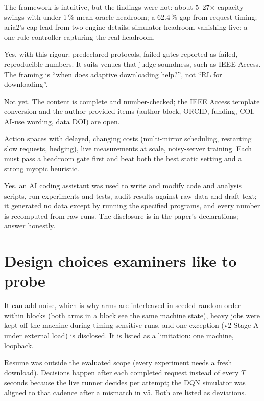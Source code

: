 \A The framework is intuitive, but the findings were not: about 5--27$\times$ capacity swings with under 1\,\% mean oracle headroom; a 62.4\,\% gap from request timing; aria2's cap lead from two engine details; simulator headroom vanishing live; a one-rule controller capturing the real headroom.

\A Yes, with this rigour: predeclared protocols, failed gates reported as failed, reproducible numbers. It suits venues that judge soundness, such as IEEE Access. The framing is ``when does adaptive downloading help?'', not ``RL for downloading''.

\A Not yet. The content is complete and number-checked; the IEEE Access template conversion and the author-provided items (author block, ORCID, funding, COI, AI-use wording, data DOI) are open.

\A Action spaces with delayed, changing costs (multi-mirror scheduling, restarting slow requests, hedging), live measurements at scale, noisy-server training. Each must pass a headroom gate first and beat both the best static setting and a strong myopic heuristic.

\A Yes, an AI coding assistant was used to write and modify code and analysis scripts, run experiments and tests, audit results against raw data and draft text; it generated no data except by running the specified programs, and every number is recomputed from raw runs. The disclosure is in the paper's declarations; answer honestly.

\section{Design choices examiners like to probe}
\A It can add noise, which is why arms are interleaved in seeded random order within blocks (both arms in a block see the same machine state), heavy jobs were kept off the machine during timing-sensitive runs, and one exception (v2 Stage A under external load) is disclosed. It is listed as a limitation: one machine, loopback.

\A Resume was outside the evaluated scope (every experiment needs a fresh download). Decisions happen after each completed request instead of every $T$ seconds because the live runner decides per attempt; the DQN simulator was aligned to that cadence after a mismatch in v5. Both are listed as deviations.

